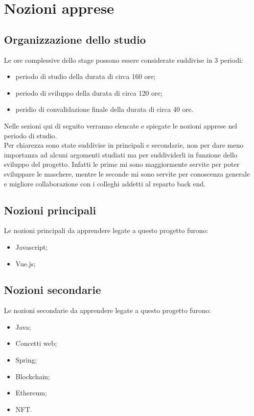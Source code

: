 
\chapter{Nozioni apprese}
\label{cap:nozioni-apprese}


\section{Organizzazione dello studio}

Le ore complessive dello stage possono essere considerate suddivise in 3 periodi:
\begin{itemize}
	\item periodo di studio della durata di circa 160 ore;
	\item periodo di sviluppo della durata di circa 120 ore;
	\item peridio di convalidazione finale della durata di circa 40 ore.
\end{itemize}

Nelle sezioni qui di seguito verranno elencate e spiegate le nozioni apprese nel periodo di studio.\\
Per chiarezza sono state suddivise in principali e secondarie, non per dare meno importanza ad alcuni argomenti studiati ma per suddividerli in funzione dello sviluppo del progetto. Infatti le prime mi sono maggiormente servite per poter sviluppare le maschere, mentre le seconde mi sono servite per conoscenza generale e migliore collaborazione con i colleghi addetti al reparto back end.

\section{Nozioni principali}

Le nozioni principali da apprendere legate a questo progetto furono:
\begin{itemize}
	\item Javascript;
	\item Vue.js;
\end{itemize}


\section{Nozioni secondarie}

Le nozioni secondarie da apprendere legate a questo progetto furono:
\begin{itemize}
	\item Java;
	\item Concetti web;
	\item Spring;
	\item Blockchain;
	\item Ethereum;
	\item NFT.
\end{itemize}

